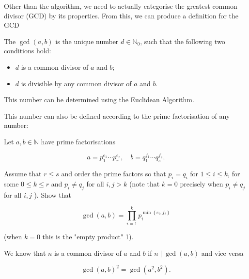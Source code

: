 \begin{blackbox}
  Other than the algorithm, we need to actually categorise the greatest common divisor (GCD) by its properties. From this, we can produce a definition for the GCD

\begin{definition}
  
The \(\operatorname{gcd}(a, b)\) is the unique number \(d \in \mathbb{N}_0\), such that the following two conditions hold:
\begin{itemize}
\item[i.] \(d\) is a common divisor of \(a\) and \(b\);
\item[ii.] \(d\) is divisible by any common divisor of \(a\) and \(b\).
\end{itemize}
This number can be determined using the Euclidean Algorithm.

\end{definition}


This number can also be defined according to the prime factorisation of any number:

\begin{definition}
  Let \(a, b \in \mathbb{N}\) have prime factorisations

\[
a=p_1^{e_1} \cdots p_r^{e_r}, \quad b=q_1^{f_1} \cdots q_s^{f_s} .
\]

Assume that \(r \leq s\) and order the prime factors so that \(p_i=q_i\) for \(1 \leq i \leq k\), for some \(0 \leq k \leq r\) and \(p_i \neq q_j\) for all \(i, j>k\) (note that \(k=0\) precisely when \(p_i \neq q_j\) for all \(i, j\) ). Show that

\[
\operatorname{gcd}(a, b)=\prod_{i=1}^k p_i^{\min \left\{e_i, f_i\right\}}
\]

(when \(k=0\) this is the "empty product" 1).
\end{definition}

\end{blackbox}

\begin{mistake}
  We know that \(n\) is a common divisor of \(a\) and \(b\) if \(n \mid \operatorname{gcd}(a,b)\) and vice versa
\end{mistake}

\begin{mistake}
 \[
\operatorname{gcd}(a, b)^2=\operatorname{gcd}\left(a^2, b^2\right) .
\] 
\end{mistake}

